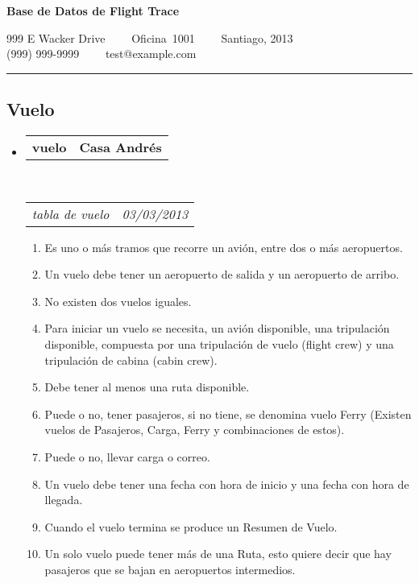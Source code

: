 \documentclass[10pt,letterpaper]{article}
\makeatletter
\newcommand{\headerrow}[2]
{\begin{tabular*}{\linewidth}{l@{\extracolsep{\fill}}r}
	#1 &
	#2 \\
\end{tabular*}}
\makeatother
\begin{document}
\begin{center}
{\LARGE \textbf{Base de Datos de Flight Trace}}

999 E Wacker Drive\ \ \textbullet
\ \ Oficina\ 1001\ \ \textbullet
\ \ Santiago, 2013
\\
(999) 999-9999\ \ \textbullet
\ \ test@example.com
\end{center}

\hrule
\vspace{-0.4em}

\subsection*{Vuelo}

\begin{itemize}
	\parskip=0.1em

	\item
	\headerrow
		{\textbf{vuelo}}
		{\textbf{Casa Andrés}}
	\\
	\headerrow
		{\emph{tabla de vuelo}}
		{\emph{03/03/2013}}
	\begin{enumerate}
		\item Es uno o más tramos que recorre un avión, entre dos o más aeropuertos.
		\item Un vuelo debe tener un aeropuerto de salida y un aeropuerto de arribo.
		\item No existen dos vuelos iguales.
		\item Para iniciar un vuelo se necesita, un avión disponible, una tripulación disponible, compuesta por una tripulación de vuelo (flight crew) y una tripulación de cabina (cabin crew).
		\item Debe tener al menos una ruta disponible.
		\item Puede o no, tener pasajeros, si no tiene, se denomina vuelo Ferry (Existen vuelos de Pasajeros, Carga, Ferry y combinaciones de estos).
		\item Puede o no, llevar carga o correo.
		\item Un vuelo debe tener una fecha con hora de inicio y una fecha con hora de llegada.
		\item Cuando el vuelo termina se produce un Resumen de Vuelo.
		\item Un solo vuelo puede tener más de una Ruta, esto quiere decir que hay pasajeros que se bajan en aeropuertos intermedios.
	\end{enumerate}

\end{itemize}
\end{document}

